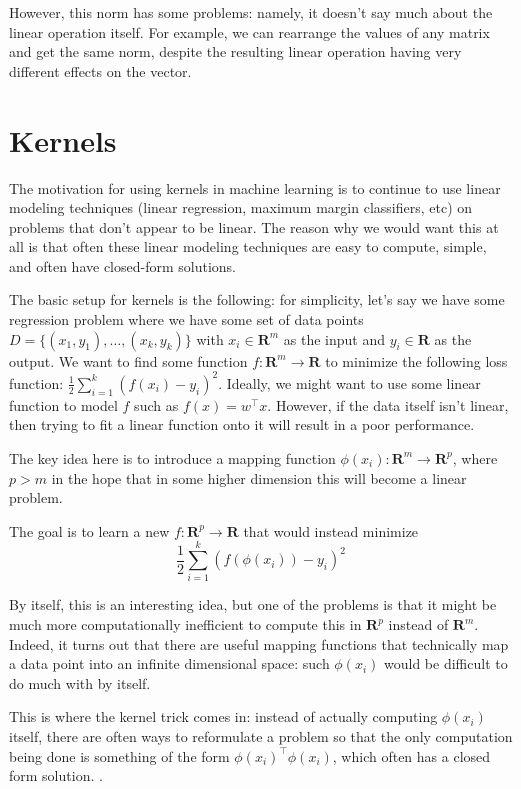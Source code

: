 \documentclass[answers,12pt]{exam}
\begin{document}
However, this norm has some problems: namely, it doesn't say much about the linear operation itself.
For example, we can rearrange the values of any matrix and get the same norm, despite the resulting linear operation having very different effects on the vector.


\section{Kernels}
The motivation for using kernels in machine learning is to continue to use linear modeling techniques (linear regression, maximum margin classifiers, etc) on problems that don't appear to be linear.
The reason why we would want this at all is that often these linear modeling techniques are easy to compute, simple, and often have closed-form solutions.

The basic setup for kernels is the following:
for simplicity, let's say we have some regression problem where we have some set of data points $D= \{(x_1,y_1),\dots, (x_k,y_k)\}$  with $x_i \in \mathbf{R}^m$ as the input and $y_i \in \mathbf{R}$ as the output.
We want to find some function $f: \mathbf{R}^m \to \mathbf{R}$ to minimize the following loss function: $\frac{1}{2}\sum_{i=1}^{k}{(f(x_i)-y_i)}^2$.
Ideally, we might want to use some linear function to model $f$ such as $f(x) = w^{\top}x$.
However, if the data itself isn't linear, then trying to fit a linear function onto it will result in a poor performance.

The key idea here is to introduce a mapping function $\phi(x_i): \mathbf{R}^m \to \mathbf{R}^p$, where $p>m$ in the hope that in some higher dimension this will become a linear problem. 

The goal is to learn a new $f: \mathbf{R}^p \to \mathbf{R}$ that would instead minimize
\[
    \frac{1}{2}\sum_{i=1}^{k}{(f(\phi(x_i))-y_i)}^2
\]

By itself, this is an interesting idea, but one of the problems is that it might be much more computationally inefficient to compute this in $\mathbf{R}^p$ instead of $\mathbf{R}^m$. 
Indeed, it turns out that there are useful mapping functions that technically map a data point into an infinite dimensional space: such $\phi(x_i)$ would be difficult to do much with by itself.

This is where the kernel trick comes in:
instead of actually computing $\phi(x_i)$ itself, there are often ways to reformulate a problem so that the only computation being done is something of the form $\phi(x_i)^{\top}\phi(x_i)$, which often has a closed form solution. .
\end{document}
